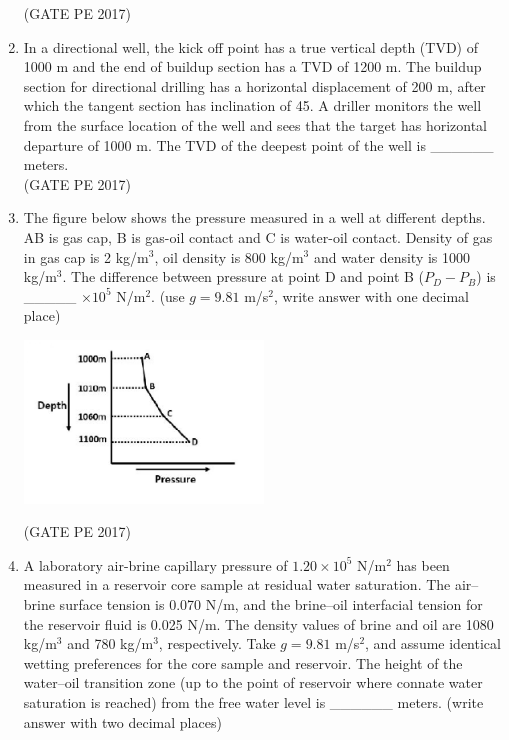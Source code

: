 \documentclass[journal,12pt,onecolumn]{IEEEtran}
\theoremstyle{remark}
\begin{document}
\begin{enumerate}[start=1, label={Q\arabic*.}]
\hfill{(GATE PE 2017)}

\item In a directional well, the kick off point has a true vertical depth (TVD) of 1000 m and the end of buildup section has a TVD of 1200 m. The buildup section for directional drilling has a horizontal displacement of 200 m, after which the tangent section has inclination of 45\degree.
A driller monitors the well from the surface location of the well and sees that the target has horizontal departure of 1000 m. The TVD of the deepest point of the well is \_\_\_\_\_\_ meters.\\

\hfill{(GATE PE 2017)}

\item The figure below shows the pressure measured in a well at different depths. AB is gas cap, B is gas-oil contact and C is water-oil contact. Density of gas in gas cap is 2 kg/m$^3$, oil density is 800 kg/m$^3$ and water density is 1000 kg/m$^3$.
The difference between pressure at point D and point B ($P_D - P_B$) is \_\_\_\_\_ $\times 10^5$ N/m$^2$. (use $g = 9.81$ m/s$^2$, write answer with one decimal place)
\begin{center}
    \includegraphics[width=0.5\textwidth]{Figs/GraphQ _33.png} 
\end{center}
\hfill{(GATE PE 2017)}

\item A laboratory air-brine capillary pressure of $1.20 \times 10^5$ N/m$^2$ has been measured in a reservoir core sample at residual water saturation. The air–brine surface tension is 0.070 N/m, and the brine–oil interfacial tension for the reservoir fluid is 0.025 N/m. The density values of brine and oil are 1080 kg/m$^3$ and 780 kg/m$^3$, respectively.
Take $g = 9.81$ m/s$^2$, and assume identical wetting preferences for the core sample and reservoir. The height of the water–oil transition zone (up to the point of reservoir where connate water saturation is reached) from the free water level is \_\_\_\_\_\_ meters. (write answer with two decimal places)\\


\end{enumerate}
\end{document}
